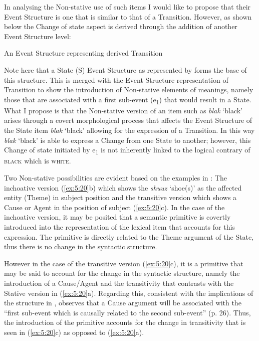 In analysing the Non-stative use of such items I would like to propose that their Event Structure is one that is similar to that of a Transition. However, as shown below the Change of state aspect is derived through the addition of another Event Structure level:

\ea\label{ex:5:24}
 An Event Structure representing derived Transition
\begin{center}
\end{center}
\z

Note here that a State (S) Event Structure as represented by \citet{Pustejovsky1991} forms the base of this structure. This is merged with the Event Structure representation of Transition to show the introduction of Non-stative elements of meanings, namely those that are associated with a first sub-event (e\textsubscript{1}) that would result in a State. What I propose is that the Non-stative version of an item such as \textit{blak} `black' arises through a covert morphological process that affects the Event Structure of the State item \textit{blak} `black' allowing for the expression of a Transition. In this way \textit{blak} `black' is able to express a Change from one State to another; however, this Change of state initiated by e\textsubscript{1} is not inherently linked to the logical contrary of \textsc{black} which is \textsc{white}. 

Two Non-stative possibilities are evident based on the examples in : The inchoative version (\ref{ex:5:20}b) which shows the \textit{shuuz} ‘shoe(s)’ as the affected entity (Theme) in subject position and the transitive version which shows a Cause or Agent in the position of subject (\ref{ex:5:20}c). In the case of the inchoative version, it may be posited that a semantic primitive \BECOME is covertly introduced into the representation of the lexical item that accounts for this expression. The primitive \BECOME is directly related to the Theme argument of the State, thus there is no change in the syntactic structure. 

However in the case of the transitive version (\ref{ex:5:20}c), it is a \CAUSE primitive that may be said to account for the change in the syntactic structure, namely the introduction of a Cause\slash Agent and the transitivity that contrasts with the Stative version in (\ref{ex:5:20}a). Regarding this, consistent with the implications of the structure in , \citet{Grimshaw1990} observes that a Cause argument will be associated with the ``first sub-event which is causally related to the second sub-event'' (p. 26). Thus, the introduction of the primitive \CAUSE accounts for the change in transitivity that is seen in (\ref{ex:5:20}c) as opposed to (\ref{ex:5:20}a).

